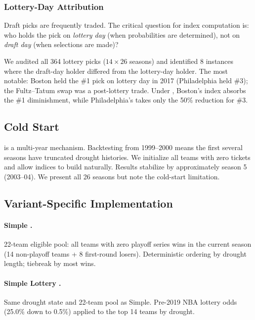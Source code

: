 \subsubsection{Lottery-Day Attribution}
\label{sec:lottery-day}

Draft picks are frequently traded. The critical question for \cola{} index computation is: who holds the pick on \emph{lottery day} (when probabilities are determined), not on \emph{draft day} (when selections are made)?

We audited all 364 lottery picks ($14 \times 26$ seasons) and identified 8 instances where the draft-day holder differed from the lottery-day holder. The most notable: Boston held the \#1 pick on lottery day in 2017 (Philadelphia held \#3); the Fultz--Tatum swap was a post-lottery trade. Under \cola{}, Boston's index absorbs the \#1 diminishment, while Philadelphia's takes only the 50\% reduction for \#3.

\subsection{Cold Start}

\cola{} is a multi-year mechanism. Backtesting from 1999--2000 means the first several seasons have truncated drought histories. We initialize all teams with zero tickets and allow indices to build naturally. Results stabilize by approximately season 5 (2003--04). We present all 26 seasons but note the cold-start limitation.

\subsection{Variant-Specific Implementation}

\paragraph{Simple \cola{}.} 22-team eligible pool: all teams with zero playoff series wins in the current season (14 non-playoff teams + 8 first-round losers). Deterministic ordering by drought length; tiebreak by most wins.

\paragraph{Simple Lottery \cola{}.} Same drought state and 22-team pool as Simple. Pre-2019 NBA lottery odds (25.0\% down to 0.5\%) applied to the top 14 teams by drought.

